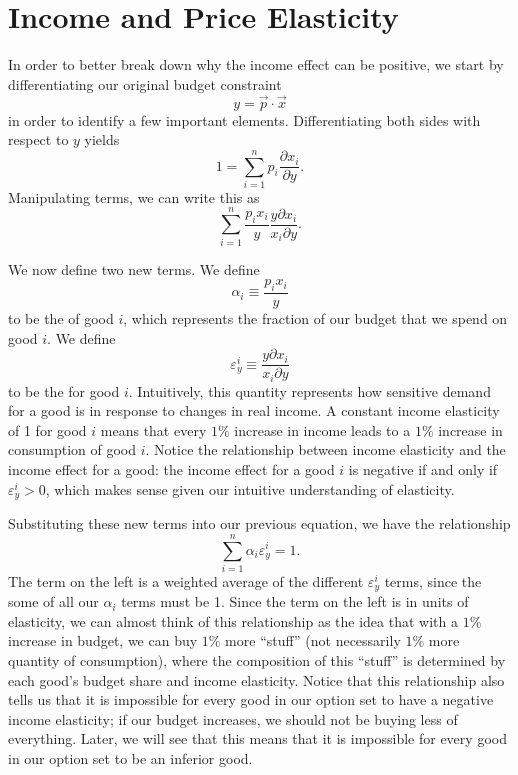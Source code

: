 \section{Income and Price Elasticity}

In order to better break down why the income effect can be positive, we start by differentiating our original budget constraint
$$y = \vec{p} \cdot \vec{x}$$
in order to identify a few important elements. Differentiating both sides with respect to $y$ yields
$$1=\sum_{i=1}^{n} p_{i} \frac{\partial x_{i}}{\partial y}.$$
Manipulating terms, we can write this as 
$$
\sum_{i=1}^{n} \frac{p_{i} x_{i}}{y} \frac{y \partial x_{i}}{x_{i} \partial y}.
$$

We now define two new terms. We define 
$$\alpha_i \equiv \frac{p_{i} x_{i}}{y}$$
to be the  of good $i$, which represents the fraction of our budget that we spend on good $i$. We define 
$$\varepsilon_y^i \equiv \frac{y \partial x_{i}}{x_{i} \partial y}$$
to be the  for good $i$. Intuitively, this quantity represents how sensitive demand for a good is in response to changes in real income. A constant income elasticity of 1 for good $i$ means that every $1\%$ increase in income leads to a $1\%$ increase in consumption of good $i$. Notice the relationship between income elasticity and the income effect for a good: the income effect for a good $i$ is negative if and only if $\varepsilon_y^i > 0$, which makes sense given our intuitive understanding of elasticity.

Substituting these new terms into our previous equation, we have the relationship
$$
\sum_{i=1}^{n} \alpha_{i} \varepsilon_{y}^{i} = 1.
$$
The term on the left is a weighted average of the different $\varepsilon_{y}^{i}$ terms, since the some of all our $\alpha_i$ terms must be 1. Since the term on the left is in units of elasticity, we can almost think of this relationship as the idea that with a $1\%$ increase in budget, we can buy $1\%$ more ``stuff'' (not necessarily $1\%$ more quantity of consumption), where the composition of this ``stuff'' is determined by each good's budget share and income elasticity.  Notice that this relationship also tells us that it is impossible for every good in our option set to have a negative income elasticity; if our budget increases, we should not be buying less of everything. Later, we will see that this means that it is impossible for every good in our option set to be an inferior good.

